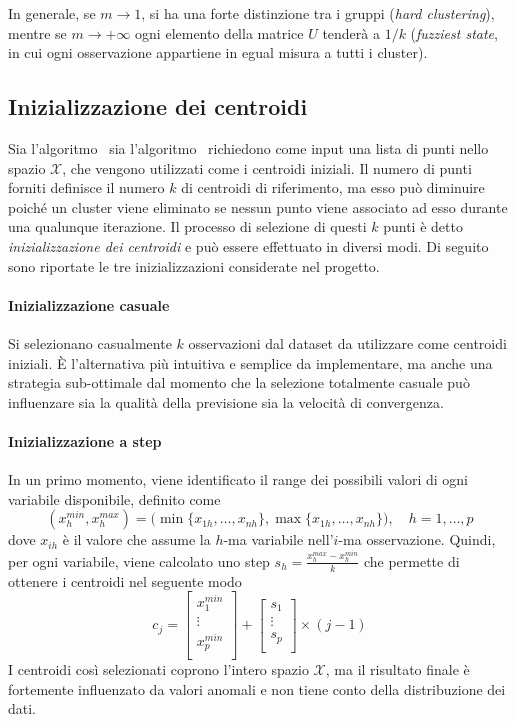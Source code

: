 \documentclass[runningheads]{llncs}
\begin{document}
In generale, se $m \rightarrow 1$, si ha una forte distinzione tra i gruppi (\textit{hard clustering}), mentre se $m \rightarrow +\infty$ ogni elemento della matrice $U$ tenderà a $1/k$ (\textit{fuzziest state}, in cui ogni osservazione appartiene in egual misura a tutti i cluster).

\subsection*{Inizializzazione dei centroidi}
Sia l'algoritmo \km\ sia l'algoritmo \fcm\ richiedono come input una lista di punti nello spazio $\mathcal{X}$, che vengono utilizzati come i centroidi iniziali.
Il numero di punti forniti definisce il numero $k$ di centroidi di riferimento, ma esso può diminuire poiché un cluster viene eliminato se nessun punto viene associato ad esso durante una qualunque iterazione.
Il processo di selezione di questi $k$ punti è detto \emph{inizializzazione dei centroidi} e può essere effettuato in diversi modi. Di seguito sono riportate le tre inizializzazioni considerate nel progetto.

\paragraph{Inizializzazione casuale}
Si selezionano casualmente $k$ osservazioni dal dataset da utilizzare come centroidi iniziali. È l'alternativa più intuitiva e semplice da implementare, ma anche una strategia sub-ottimale dal momento che la selezione totalmente casuale può influenzare sia la qualità della previsione sia la velocità di convergenza.


\paragraph{Inizializzazione a step}
In un primo momento, viene identificato il range dei possibili valori di ogni variabile disponibile, definito come
\[
    (x^{min}_h,x^{max}_h)= \big(\min\{{x_{1h}, \ldots, x_{nh}}\}, \max\{{x_{1h}, \ldots, x_{nh}}\} \big), \quad h=1, \ldots, p
\]
dove $x_{ih}$ è il valore che assume la $h$-ma variabile nell'$i$-ma osservazione. Quindi, per ogni variabile, viene calcolato uno step $s_h=\frac{x^{max}_h-x^{min}_h}{k}$ che permette di ottenere i centroidi nel seguente modo
\[
    c_j =
    \begin{bmatrix}
    x^{min}_1\\
    \vdots\\
    x^{min}_p\\
    \end{bmatrix}
    +
    \begin{bmatrix}
    s_1\\
    \vdots\\
    s_p\\
    \end{bmatrix}
    \times (j-1)
\]
I centroidi così selezionati coprono l'intero spazio $\mathcal{X}$, ma il risultato finale è fortemente influenzato da valori anomali e non tiene conto della distribuzione dei dati.
\end{document}
